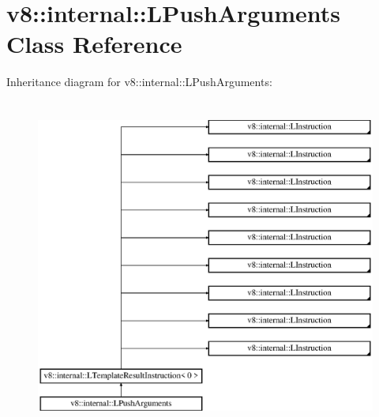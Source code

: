 \hypertarget{classv8_1_1internal_1_1_l_push_arguments}{}\section{v8\+:\+:internal\+:\+:L\+Push\+Arguments Class Reference}
\label{classv8_1_1internal_1_1_l_push_arguments}
Inheritance diagram for v8\+:\+:internal\+:\+:L\+Push\+Arguments\+:\begin{figure}[H]
\begin{center}
\leavevmode
\includegraphics[height=11.000000cm]{classv8_1_1internal_1_1_l_push_arguments}
\end{center}
\end{figure}
